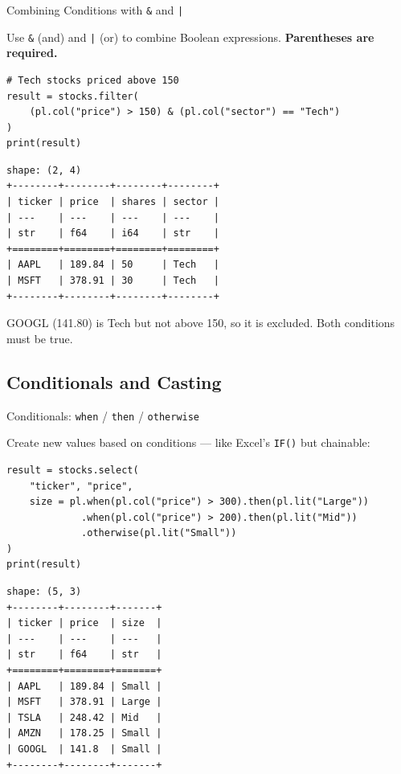 \documentclass[9pt,aspectratio=169]{beamer}
\begin{document}
\begin{frame}[fragile]{Combining Conditions with \texttt{\&} and \texttt{|}}

Use \texttt{\&} (and) and \texttt{|} (or) to combine Boolean expressions. \textbf{Parentheses are required.}

\begin{lstlisting}
# Tech stocks priced above 150
result = stocks.filter(
    (pl.col("price") > 150) & (pl.col("sector") == "Tech")
)
print(result)
\end{lstlisting}

\begin{lstlisting}[style=output]
shape: (2, 4)
+--------+--------+--------+--------+
| ticker | price  | shares | sector |
| ---    | ---    | ---    | ---    |
| str    | f64    | i64    | str    |
+========+========+========+========+
| AAPL   | 189.84 | 50     | Tech   |
| MSFT   | 378.91 | 30     | Tech   |
+--------+--------+--------+--------+
\end{lstlisting}

\begin{highlightbox}
\centering
GOOGL (141.80) is Tech but not above 150, so it is excluded. Both conditions must be true.
\end{highlightbox}

\end{frame}


\subsection{Conditionals and Casting}
\begin{frame}[fragile]{Conditionals: \texttt{when} / \texttt{then} / \texttt{otherwise}}

Create new values based on conditions --- like Excel's \texttt{IF()} but chainable:

\begin{lstlisting}
result = stocks.select(
    "ticker", "price",
    size = pl.when(pl.col("price") > 300).then(pl.lit("Large"))
             .when(pl.col("price") > 200).then(pl.lit("Mid"))
             .otherwise(pl.lit("Small"))
)
print(result)
\end{lstlisting}

\begin{lstlisting}[style=output]
shape: (5, 3)
+--------+--------+-------+
| ticker | price  | size  |
| ---    | ---    | ---   |
| str    | f64    | str   |
+========+========+=======+
| AAPL   | 189.84 | Small |
| MSFT   | 378.91 | Large |
| TSLA   | 248.42 | Mid   |
| AMZN   | 178.25 | Small |
| GOOGL  | 141.8  | Small |
+--------+--------+-------+
\end{lstlisting}

\end{frame}
\end{document}
